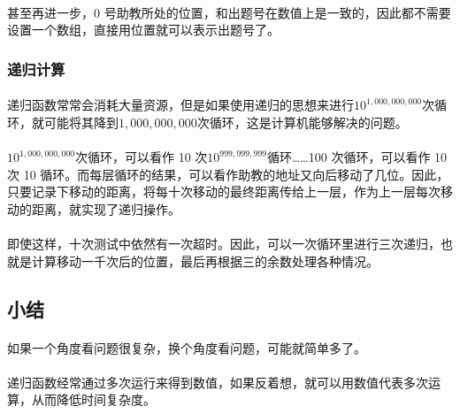 \documentclass[UTF-8, 12pt]{ctexart}
\begin{document}
    	\paragraph{}
    甚至再进一步，0 号助教所处的位置，和出题号在数值上是一致的，因此都不需要设置一个数组，直接用位置就可以表示出题号了。
    	\subsubsection{递归计算}
    	\paragraph{}
    递归函数常常会消耗大量资源，但是如果使用递归的思想来进行$10^{1,000,000,000}$次循环，就可能将其降到$1,000,000,000$次循环，这是计算机能够解决的问题。
    	\paragraph{}
    $10^{1,000,000,000}$次循环，可以看作 10 次$10^{999,999,999}$循环……100 次循环，可以看作 10 次 10 循环。而每层循环的结果，可以看作助教的地址又向后移动了几位。因此，只要记录下移动的距离，将每十次移动的最终距离传给上一层，作为上一层每次移动的距离，就实现了递归操作。
    	\paragraph{}
    即使这样，十次测试中依然有一次超时。因此，可以一次循环里进行三次递归，也就是计算移动一千次后的位置，最后再根据三的余数处理各种情况。
    \subsection{小结}
    \paragraph{}
    如果一个角度看问题很复杂，换个角度看问题，可能就简单多了。
    \paragraph{}
    递归函数经常通过多次运行来得到数值，如果反着想，就可以用数值代表多次运算，从而降低时间复杂度。
\end{document}
